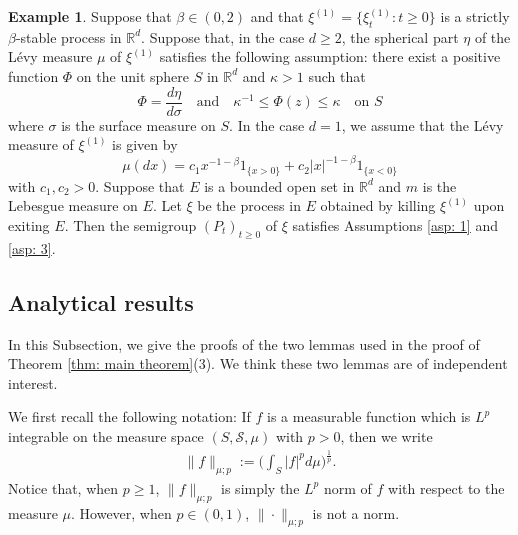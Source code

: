 \documentclass[12pt,a4paper]{amsart}
\theoremstyle{definition}
\newtheorem{exa}[thm]{Example}
\numberwithin{equation}{section}
\begin{document}
\begin{exa} {\rm
Suppose that $\beta\in (0, 2)$ and that $\xi^{(1)}=\{\xi^{(1)}_t: t\ge0\}$ is a strictly
$\beta$-stable process in $\mathbb{R}^d$. Suppose that, in the case $d\ge 2$, the spherical
part $\eta$ of the L\'evy measure $\mu$ of $\xi^{(1)}$ satisfies the following assumption: there
exist a positive function $\Phi$ on the unit sphere $S$ in $\mathbb{R}^d$ and $\kappa>1$
such that
$$
\Phi=\frac{d\eta}{d\sigma} \quad \mbox{and} \quad
\kappa^{-1}\le \Phi(z)\le \kappa \quad \mbox{on } S
$$
where $\sigma$ is the surface measure on $S$. In the case $d=1$, we assume that the L\'evy
measure of $\xi^{(1)}$ is given by
$$
\mu(dx)=c_1x^{-1-\beta}1_{\{x>0\}}+ c_2|x|^{-1-\beta}1_{\{x<0\}}
$$
with $c_1, c_2>0$. Suppose that $E$ is a bounded open set in $\mathbb{R}^d$
and $m$ is the Lebesgue measure on $E$.
Let $\xi$ be the process in $E$ obtained by killing $\xi^{(1)}$ upon exiting $E$.
Then the semigroup $(P_t)_{t\ge 0}$ of $\xi$ satisfies
Assumptions \ref{asp: 1} and \ref{asp: 3}. 
}
\end{exa}

\subsection{Analytical results}
\label{sec: Characterizing the Zolotarev's distribution using an non-linear delay equation}
In this Subsection, we give the proofs of the two lemmas used in the proof of Theorem \ref{thm: main theorem}(3). We think these two lemmas are of independent interest.

We first recall the following notation:
If $f$ is a measurable function which is $L^p$ integrable on the measure space $(S,\mathscr S,\mu)$ with $p > 0$, then we write
\begin{align}
	\|f\|_{\mu;p}
	:= \Big(\int_{S} |f|^p d\mu \Big)^{\frac{1}{p}}.
\end{align}
Notice that, when $p\geq 1$, $\|f\|_{\mu;p}$ is simply the $L^p$ norm of $f$ with respect to the measure $\mu$.	
However, when $p \in (0,1)$, $\|\cdot\|_{\mu; p}$ is not a norm.

\end{document}
